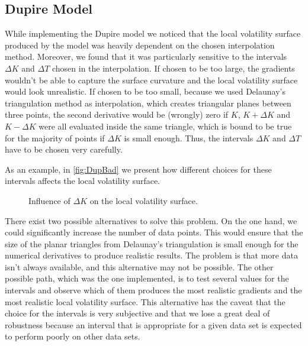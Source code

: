 \subsection{Dupire Model}
While implementing the Dupire model we noticed that the local volatility surface produced by the model was heavily dependent on the chosen interpolation method. Moreover, we found that it was particularly sensitive to the intervals $\Delta K$ and $\Delta T$ chosen in the interpolation. If chosen to be too large, the gradients wouldn't be able to capture the surface curvature and the local volatility surface would look unrealistic. If chosen to be too small, because we used Delaunay's triangulation method as interpolation, which creates triangular planes between three points, the second derivative would be (wrongly) zero if $K$, $K+\Delta K$ and $K-\Delta K$ were all evaluated inside the same triangle, which is bound to be true for the majority of points if $\Delta K$ is small enough.
Thus, the intervals $\Delta K$ and $\Delta T$ have to be chosen very carefully.

As an example, in \autoref{fig:DupBad} we present how different choices for these intervals affects the local volatility surface.

\vspace{\fill}
\newpage

\begin{figure}[H]
  \begin{subfigmatrix}{2}
  \end{subfigmatrix}
    \caption[Influence of $\Delta K$ on the local volatility surface.]{Influence of $\Delta K$ on the local volatility surface.}\label{fig:DupBad}
\end{figure} 

There exist two possible alternatives to solve this problem.
On the one hand, we could significantly increase the number of data points. This would ensure that the size of the planar triangles from Delaunay's triangulation is small enough for the numerical derivatives to produce realistic results. The problem is that more data isn't always available, and this alternative may not be possible.
The other possible path, which was the one implemented, is to test several values for the intervals and observe which of them produces the most realistic gradients and the most realistic local volatility surface. This alternative has the caveat that the choice for the intervals is very subjective and that we lose a great deal of robustness because an interval that is appropriate for a given data set is expected to perform poorly on other data sets.


